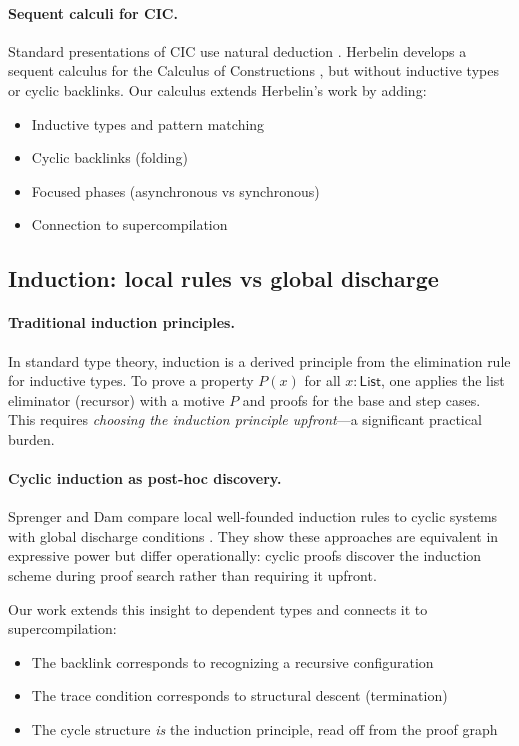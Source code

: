 \paragraph{Sequent calculi for CIC.}
Standard presentations of CIC use natural deduction \cite{coquand-huet-1988-coc,paulin-mohring-1993-inductive}.
Herbelin develops a sequent calculus for the Calculus of Constructions \cite{herbelin-1995-sequent-calculus}, but without inductive types or cyclic backlinks.
Our calculus extends Herbelin's work by adding:
\begin{itemize}
\item Inductive types and pattern matching
\item Cyclic backlinks (folding)
\item Focused phases (asynchronous vs synchronous)
\item Connection to supercompilation
\end{itemize}

\subsection{Induction: local rules vs global discharge}

\paragraph{Traditional induction principles.}
In standard type theory, induction is a derived principle from the elimination rule for inductive types.
To prove a property $P(x)$ for all $x : \mathsf{List}$, one applies the list eliminator (recursor) with a motive $P$ and proofs for the base and step cases.
This requires \emph{choosing the induction principle upfront}---a significant practical burden.

\paragraph{Cyclic induction as post-hoc discovery.}
Sprenger and Dam compare local well-founded induction rules to cyclic systems with global discharge conditions \cite{sprenger-dam-2003-circular-tree}.
They show these approaches are equivalent in expressive power but differ operationally: cyclic proofs discover the induction scheme during proof search rather than requiring it upfront.

Our work extends this insight to dependent types and connects it to supercompilation:
\begin{itemize}
\item The backlink corresponds to recognizing a recursive configuration
\item The trace condition corresponds to structural descent (termination)
\item The cycle structure \emph{is} the induction principle, read off from the proof graph
\end{itemize}


